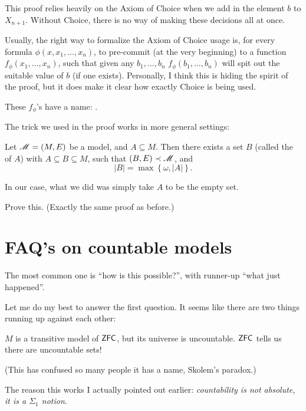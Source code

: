 \begin{remark}
	This proof relies heavily on the Axiom of Choice
	when we add in the element $b$ to $X_{n+1}$.
	Without Choice, there is no way of making these decisions all at once.

	Usually, the right way to formalize the Axiom of Choice usage is,
	for every formula $\phi(x, x_1, \dots, x_n)$, to pre-commit (at the very beginning)
	to a function $f_\phi(x_1, \dots, x_n)$, such that given any $b_1, \dots, b_n$
	$f_\phi(b_1, \dots, b_n)$ will spit out the suitable value of $b$ (if one exists).
	Personally, I think this is hiding the spirit of the proof, but it does
	make it clear how exactly Choice is being used.

	These $f_\phi$'s have a name: .
\end{remark}

The trick we used in the proof works in more general settings:
\begin{theorem}
	Let $\mathscr M = (M,E)$ be a model, and $A \subseteq M$.
	Then there exists a set $B$ (called the  of $A$)
	with $A \subseteq B \subseteq M$,
	such that $(B,E) \prec \mathscr M$, and
	\[ \left\lvert B \right\rvert =
		\max \left\{ \omega, \left\lvert A \right\rvert \right\}. \]
\end{theorem}
In our case, what we did was simply take $A$ to be the empty set.
\begin{ques}
	Prove this. (Exactly the same proof as before.)
\end{ques}


\section{FAQ's on countable models}
The most common one is ``how is this possible?'',
with runner-up ``what just happened''.

Let me do my best to answer the first question.
It seems like there are two things running up against each other:
\begin{enumerate}[(1)]
	\ii $M$ is a transitive model of $\mathsf{ZFC}$, but its universe is uncountable.
	\ii $\mathsf{ZFC}$ tells us there are uncountable sets!
\end{enumerate}
(This has confused so many people it has a name, Skolem's paradox.)

The reason this works I actually pointed out earlier:
\emph{countability is not absolute, it is a $\Sigma_1$ notion}.

